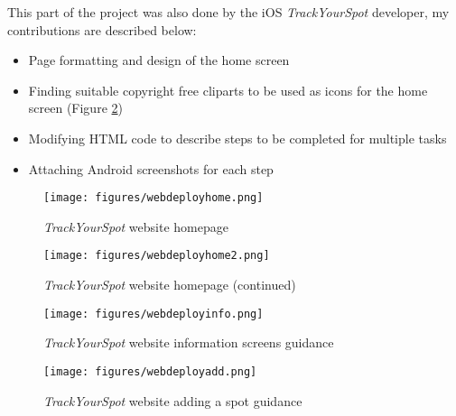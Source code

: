 This part of the project was also done by the iOS \emph{TrackYourSpot} developer, my contributions are described below: 
\begin{itemize}
    \item Page formatting and design of the home screen
    \item Finding suitable copyright free cliparts to be used as icons for the home screen (Figure \ref{fig:webdeployhome2}) 
    \item Modifying HTML code to describe steps to be completed for multiple tasks
    \item Attaching Android screenshots for each step
\end{itemize}


\begin{figure}
    \texttt{[image: figures/webdeployhome.png]}
    \caption{\emph{TrackYourSpot} website homepage}
    \label{fig:webdeployhome}
\end{figure}

\begin{figure}
    \texttt{[image: figures/webdeployhome2.png]}
    \caption{\emph{TrackYourSpot} website homepage (continued)}
    \label{fig:webdeployhome2}
\end{figure}

\begin{figure}
    \texttt{[image: figures/webdeployinfo.png]}
    \caption{\emph{TrackYourSpot} website information screens guidance}
    \label{fig:webdeployinfo}
\end{figure}

\begin{figure}
    \texttt{[image: figures/webdeployadd.png]}
    \caption{\emph{TrackYourSpot} website adding a spot guidance}
    \label{fig:webdeployadd}
\end{figure}


